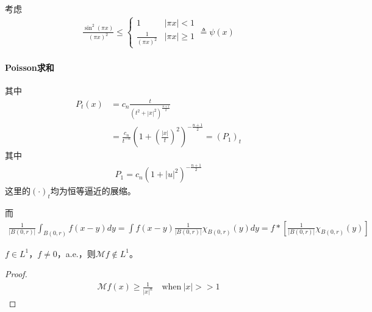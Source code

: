 考虑
\begin{align*}
    \frac{\sin^2(\pi x)}{(\pi x)^2} \leqslant \begin{cases}
        1 & |\pi x| < 1 \\
        \frac{1}{(\pi x)^2} & |\pi x|\geqslant 1
    \end{cases} \triangleq \psi(x)
\end{align*}

\paragraph{Poisson求和} 其中
\begin{align*}
    P_t(x) &= c_n \frac{t}{(t^2 + |x|^2)^{\frac{n+1}{2}}} \\
    & = \frac{c_n}{t^{-n}} \left( 1 + \left(\frac{|x|}{t}\right)^2\right)^{-\frac{n+1}{2}} = (P_1)_t
\end{align*}
其中
\begin{align*}
    P_1 = c_n \left( 1 + |u|^2\right)^{-\frac{n+1}{2}}
\end{align*}
这里的$(\cdot)_t$均为恒等逼近的展缩。

而
\begin{align*}
    \frac{1}{|B(0,r)|} \int_{B(0,r)} f(x-y) dy = \int f(x-y) \frac{1}{|B(0,r)|} \chi_{B(0,r)}(y) dy = f * \left[\frac{1}{|B(0,r)|} \chi_{B(0,r)}(y) \right]
\end{align*}
\begin{remark}
    $f\in L^1$，$f\neq 0$，a.e.，则$\mathcal{M} f\notin L^1$。
\end{remark}
\begin{proof}
    \begin{align*}
        \mathcal{M} f(x) \geqslant \frac{1}{|x|^n} \quad \text{when}\ |x| > > 1
    \end{align*}
\end{proof}


